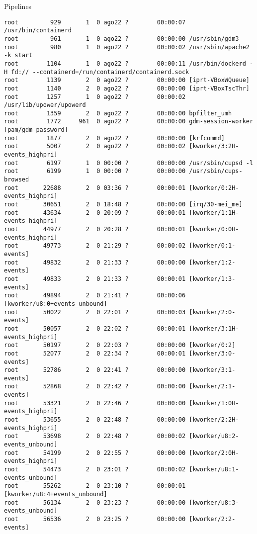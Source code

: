 \begin{section}{Pipelines}
\begin{lstlisting}[style=Ubuntu]
root         929       1  0 ago22 ?        00:00:07 /usr/bin/containerd
root         961       1  0 ago22 ?        00:00:00 /usr/sbin/gdm3
root         980       1  0 ago22 ?        00:00:02 /usr/sbin/apache2 -k start
root        1104       1  0 ago22 ?        00:00:11 /usr/bin/dockerd -H fd:// --containerd=/run/containerd/containerd.sock
root        1139       2  0 ago22 ?        00:00:00 [iprt-VBoxWQueue]
root        1140       2  0 ago22 ?        00:00:00 [iprt-VBoxTscThr]
root        1257       1  0 ago22 ?        00:00:02 /usr/lib/upower/upowerd
root        1359       2  0 ago22 ?        00:00:00 bpfilter_umh
root        1772     961  0 ago22 ?        00:00:00 gdm-session-worker [pam/gdm-password]
root        1877       2  0 ago22 ?        00:00:00 [krfcommd]
root        5007       2  0 ago22 ?        00:00:02 [kworker/3:2H-events_highpri]
root        6197       1  0 00:00 ?        00:00:00 /usr/sbin/cupsd -l
root        6199       1  0 00:00 ?        00:00:00 /usr/sbin/cups-browsed
root       22688       2  0 03:36 ?        00:00:01 [kworker/0:2H-events_highpri]
root       30651       2  0 18:48 ?        00:00:00 [irq/30-mei_me]
root       43634       2  0 20:09 ?        00:00:01 [kworker/1:1H-events_highpri]
root       44977       2  0 20:28 ?        00:00:01 [kworker/0:0H-events_highpri]
root       49773       2  0 21:29 ?        00:00:02 [kworker/0:1-events]
root       49832       2  0 21:33 ?        00:00:00 [kworker/1:2-events]
root       49833       2  0 21:33 ?        00:00:01 [kworker/1:3-events]
root       49894       2  0 21:41 ?        00:00:06 [kworker/u8:0+events_unbound]
root       50022       2  0 22:01 ?        00:00:03 [kworker/2:0-events]
root       50057       2  0 22:02 ?        00:00:01 [kworker/3:1H-events_highpri]
root       50197       2  0 22:03 ?        00:00:00 [kworker/0:2]
root       52077       2  0 22:34 ?        00:00:01 [kworker/3:0-events]
root       52786       2  0 22:41 ?        00:00:00 [kworker/3:1-events]
root       52868       2  0 22:42 ?        00:00:00 [kworker/2:1-events]
root       53321       2  0 22:46 ?        00:00:00 [kworker/1:0H-events_highpri]
root       53655       2  0 22:48 ?        00:00:00 [kworker/2:2H-events_highpri]
root       53698       2  0 22:48 ?        00:00:02 [kworker/u8:2-events_unbound]
root       54199       2  0 22:55 ?        00:00:00 [kworker/2:0H-events_highpri]
root       54473       2  0 23:01 ?        00:00:02 [kworker/u8:1-events_unbound]
root       55262       2  0 23:10 ?        00:00:01 [kworker/u8:4+events_unbound]
root       56134       2  0 23:23 ?        00:00:00 [kworker/u8:3-events_unbound]
root       56536       2  0 23:25 ?        00:00:00 [kworker/2:2-events]


\end{lstlisting}
\end{section}
